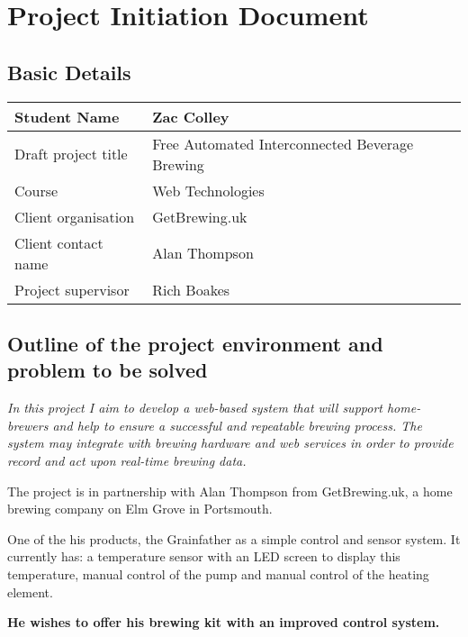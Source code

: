 \chapter{Project Initiation Document}

\section{Basic Details}

\begin{table}[h]
\centering
\begin{tabular}{|l|l|}
\hline
Student Name        & Zac Colley                                     \\ \hline
Draft project title & Free Automated Interconnected Beverage Brewing \\ \hline
Course              & Web Technologies                               \\ \hline
Client organisation & GetBrewing.uk                                  \\ \hline
Client contact name & Alan Thompson                                  \\ \hline
Project supervisor  & Rich Boakes                                    \\ \hline
\end{tabular}
\end{table}

\section{Outline of the project environment and problem to be solved}

\textit{In this project I aim to develop a web-based system that will support home-brewers and help to ensure a successful and repeatable brewing process. The system may integrate with brewing hardware and web services in order to provide record and act upon real-time brewing data.}

The project is in partnership with Alan Thompson from GetBrewing.uk, a home brewing company on Elm Grove in Portsmouth.

One of the his products, the Grainfather as a simple control and sensor system. It currently has: a temperature sensor with an LED screen to display this temperature, manual control of the pump and manual control of the heating element.

\textbf{He wishes to offer his brewing kit with an improved control system.}

